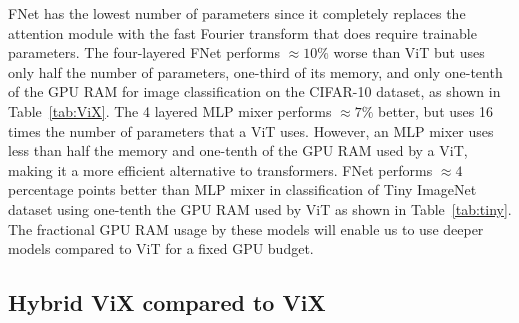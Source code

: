 \documentclass{article}
\begin{document}
FNet has the lowest number of parameters since it completely replaces the attention module with the fast Fourier transform that does require trainable parameters. The four-layered FNet performs $\approx 10 \%$ worse than ViT but uses only half the number of parameters, one-third of its memory, and only one-tenth of the GPU RAM for image classification on the CIFAR-10 dataset, as shown in Table~\ref{tab:ViX}. The 4 layered MLP mixer performs $\approx 7 \%$ better, but uses 16 times the number of parameters that a ViT uses. However, an MLP mixer uses less than half the memory and one-tenth of the GPU RAM used by a ViT, making it a more efficient alternative to transformers. FNet performs $\approx 4$ percentage points better than MLP mixer in classification of Tiny ImageNet dataset using one-tenth the GPU RAM used by ViT as shown in Table~\ref{tab:tiny}. The fractional GPU RAM usage by these models will enable us to use deeper models compared to ViT for a fixed GPU budget. 


\subsection{Hybrid ViX compared to ViX}
\end{document}
